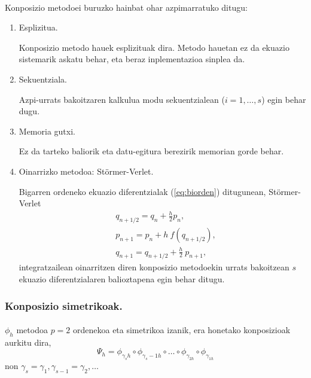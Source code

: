 \paragraph*{}Konposizio metodoei buruzko hainbat ohar azpimarratuko ditugu:
\begin{enumerate}
\item{Esplizitua.}

Konposizio metodo hauek esplizituak dira. Metodo hauetan ez da ekuazio sistemarik askatu behar, eta beraz inplementazioa sinplea da. 

\item{Sekuentziala.}

Azpi-urrats bakoitzaren kalkulua modu sekuentzialean ($i=1,\dots,s$) egin behar dugu.

\item{Memoria gutxi.}

Ez da tarteko baliorik eta datu-egitura berezirik memorian gorde behar.   

\item{Oinarrizko metodoa: Störmer-Verlet.}

Bigarren ordeneko ekuazio diferentzialak (\ref{eq:biorden}) ditugunean, Störmer-Verlet 
\begin{align*}
&q_{{n+1}/{2}}=q_n+\frac{h}{2} p_n,\\
&p_{n+1}=p_n+h \ f(q_{{n+1}/{2}}),\\
&q_{n+1}=q_{{n+1}/{2}}+\frac{h}{2} \ p_{n+1},
\end{align*}
integratzailean oinarritzen diren konposizio metodoekin urrats bakoitzean $s$ ekuazio diferentzialaren balioztapena egin behar ditugu.

\end{enumerate}

\subsubsection*{Konposizio simetrikoak.}

\paragraph*{}$\phi_h$ metodoa $p=2$ ordenekoa eta simetrikoa izanik, era honetako konposizioak aurkitu dira,
\begin{equation}
\Psi_h=\phi_{\gamma_s h} \circ \phi_{\gamma_s-1 h} \circ \dots \circ \phi_{\gamma_{2 h}} \circ \phi_{\gamma_{1 h}} 
\end{equation}
non $\gamma_s=\gamma_1, \gamma_{s-1}=\gamma_2,\dots$ 

